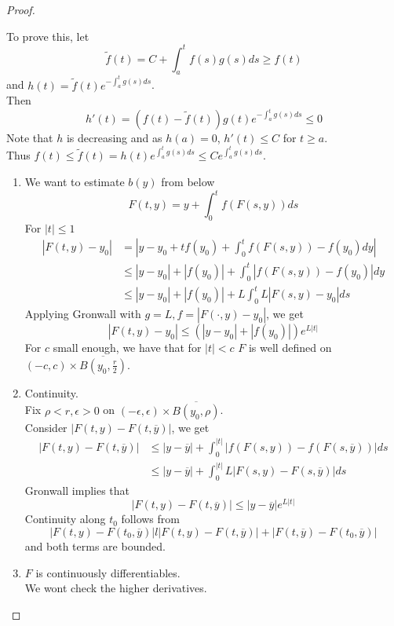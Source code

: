\documentclass[../main.tex]{subfiles}
\begin{document}
\begin{proof}
\begin{lemma}
	
\end{lemma}
To prove this, let
\[ 
\tilde f ( t) = C+ \int_{ a }^{ t }f( s) g( s) ds \geq f( t) 
\]
and $h( t) = \tilde f ( t) e^{- \int_{ a }^{ t }g( s) ds} $.\\
Then
\[ 
h'( t) = ( f( t) - \tilde f( t) ) g( t) e^{- \int_{ a }^{ t }g( s) ds}  \leq 0
\]
Note that $h$ is decreasing and as $h( a) =0$, $h'( t) \leq C$ for $t \geq a$.\\
Thus $f( t) \leq \tilde f ( t) = h( t) e^{ \int_{ a }^{ t }g( s) ds} \leq  C e^{ \int_{ a }^{ t }g( s) ds} $.
\begin{enumerate}
\item We want to estimate $b( y) $ from below
	\[ 
	F( t,y) = y+ \int_{ 0 }^{ t } f( F( s,y) ) ds
	\]
	For $|t| \leq 1$
	\begin{align*}
		|F( t,y) - y_0| &= |y-y_0 +t f( y_0) + \int_{ 0 }^{ t } f( F( s,y) ) -f ( y_0)  dy  |\\
		& \leq |y-y_0| + |f( y_0) | + \int_{ 0 }^{ t }|f( F( s,y) ) - f( y_0) | dy\\
		& \leq  |y-y_0| + |f( y_0) | + L \int_{ 0 }^{ t } L |F( s,y) - y_0|ds
	\end{align*}
Applying Gronwall with $g=L, f= |F( \cdot,y) -y_0|$, we get
\[ 
|F( t,y) -y_0| \leq ( |y-y_0| + |f( y_0) |) e^{L |t|} 
\]
For $c$ small enough, we have that for $|t|< c$ $F$ is well defined on $( -c,c) \times \overline{B( y_0, \frac{r}{2}) }$.
\item Continuity.\\
	Fix $\rho < r, \epsilon>0$ on $( -\epsilon,\epsilon) \times \overline{B( y_0, \rho) }$.\\
	Consider $|F( t,y) - F( t, \overline{y})| $, we get
	\begin{align*}
		|F( t,y) - F( t,\overline{y}) | &\leq  |y-\overline{y}| + \int_{ 0 }^{ |t| }|f( F( s,y) ) - f( F( s,\overline{y}) ) | ds\\
						& \leq  |y-\overline{y}| + \int_{ 0 }^{ |t| } L |F( s,y) - F( s, \overline{y}) | ds	
	\end{align*}
	Gronwall implies that
	\[ 
	|F( t,y) - F( t,\overline{y}) | \leq  |y-\overline{y}| e^{L |t|} 
	\]
	Continuity along $t_0$ follows from
	\[ 
	|F( t,y) - F( t_0,\overline{y}) | l | F( t,y) - F( t, \overline{y}) | + |F( t,\overline{y}) - F( t_0,\overline{y}) |	
	\]
	and both terms are bounded.
\item $F$ is continuously differentiables.\\
	We wont check the higher derivatives.\\

\end{enumerate}
\end{proof}
\end{document}
